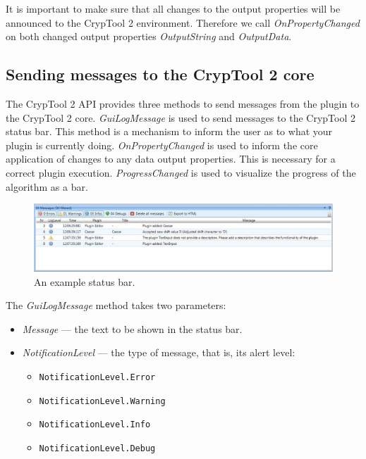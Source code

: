 It is important to make sure that all changes to the output properties will be announced to the CrypTool 2 environment. Therefore we call \textit{OnPropertyChanged} on both changed output properties \textit{OutputString} and \textit{OutputData}.

\subsection{Sending messages to the CrypTool 2 core}
\label{sec:SendingMessagesToTheCrypTool2Core}

The CrypTool 2 API provides three methods to send messages from the plugin to the CrypTool 2 core. \textit{GuiLogMessage} is used to send messages to the CrypTool 2 status bar. This method is a mechanism to inform the user as to what your plugin is currently doing. \textit{OnPropertyChanged} is used to inform the core application of changes to any data output properties. This is necessary for a correct plugin execution. \textit{ProgressChanged} is used to visualize the progress of the algorithm as a bar.

\begin{figure}[h]
	\centering
		\includegraphics[width=1.00\textwidth]{figures/status_bar.jpg}
	\caption{An example status bar.}
	\label{fig:status_bar}
\end{figure}

The \textit{GuiLogMessage} method takes two parameters:

\begin{itemize}
	\item \textit{Message} --- the text to be shown in the status bar.
	\item \textit{NotificationLevel} --- the type of message, that is, its alert level:
	\begin{itemize}
		\item \texttt{NotificationLevel.Error}
		\item \texttt{NotificationLevel.Warning}
		\item \texttt{NotificationLevel.Info}
		\item \texttt{NotificationLevel.Debug}
	\end{itemize}
\end{itemize}

